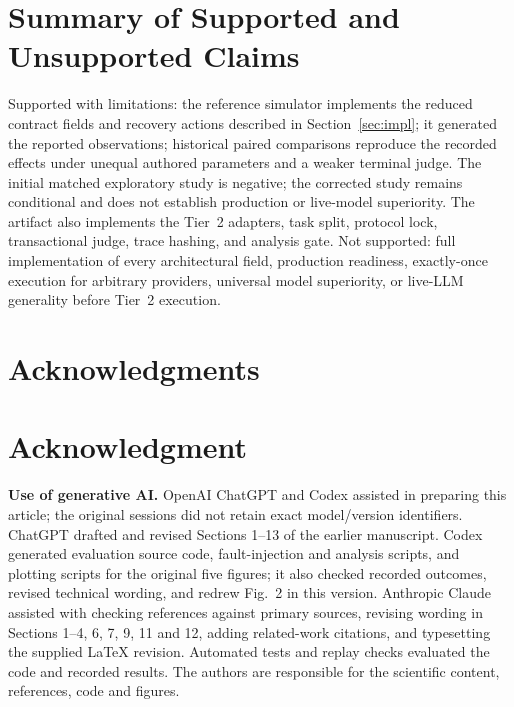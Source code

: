 \documentclass[10pt,journal,compsoc]{IEEEtran}
\begin{document}
\section{Summary of Supported and Unsupported Claims}
Supported with limitations: the reference simulator implements the reduced contract fields and recovery actions described in Section~\ref{sec:impl}; it generated the reported observations; historical paired comparisons reproduce the recorded effects under unequal authored parameters and a weaker terminal judge. The initial matched exploratory study is negative; the corrected study remains conditional and does not establish production or live-model superiority. The artifact also implements the Tier~2 adapters, task split, protocol lock, transactional judge, trace hashing, and analysis gate. Not supported: full implementation of every architectural field, production readiness, exactly-once execution for arbitrary providers, universal model superiority, or live-LLM generality before Tier~2 execution.

\ifieeeclass
\section*{Acknowledgments}
\else
\section*{Acknowledgment}
\fi
\textbf{Use of generative AI.} OpenAI ChatGPT and Codex assisted in preparing this article; the original sessions did not retain exact model/version identifiers. ChatGPT drafted and revised Sections 1--13 of the earlier manuscript. Codex generated evaluation source code, fault-injection and analysis scripts, and plotting scripts for the original five figures; it also checked recorded outcomes, revised technical wording, and redrew Fig.~2 in this version. Anthropic Claude assisted with checking references against primary sources, revising wording in Sections 1--4, 6, 7, 9, 11 and 12, adding related-work citations, and typesetting the supplied LaTeX revision. Automated tests and replay checks evaluated the code and recorded results. The authors are responsible for the scientific content, references, code and figures.
\end{document}
